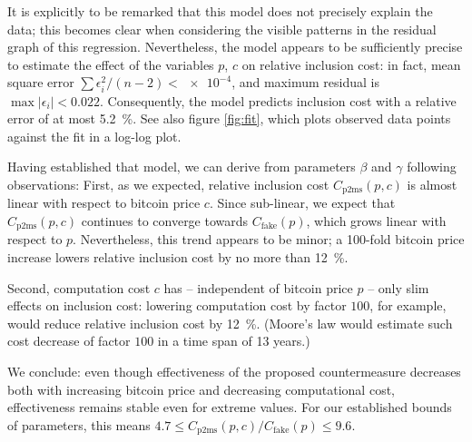 \documentclass[a4paper,11pt,titlepage]{scrbook}
\begin{document}
It is explicitly to be remarked that this model does not precisely explain the data; this becomes clear when considering the visible patterns in the residual graph of this regression.
Nevertheless, the model appears to be sufficiently precise to estimate the effect of the variables $p$, $c$ on relative inclusion cost: in fact, mean square error $\sum \epsilon_i^2/(n-2) < \num{e-4}$, and maximum residual is $\max |\epsilon_i| < 0.022$. Consequently, the model predicts inclusion cost with a relative error of at most \SI{5.2}{\percent}.
See also figure \ref{fig:fit}, which plots observed data points against the fit in a log-log plot.

Having established that model, we can derive from parameters $\beta$ and $\gamma$ following observations:
First, as we expected, relative inclusion cost $C_\mathrm{p2ms}(p,c)$ is almost linear with respect to bitcoin price $c$.
Since sub-linear, we expect that $C_\mathrm{p2ms}(p,c)$ continues to converge towards $C_\mathrm{fake}(p)$, which grows linear with respect to $p$.
Nevertheless, this trend appears to be minor; a 100-fold bitcoin price increase lowers relative inclusion cost by no more than \SI{12}{\percent}.

Second, computation cost $c$ has – independent of bitcoin price $p$ – only slim effects on inclusion cost: lowering computation cost by factor $100$, for example, would reduce relative inclusion cost by \SI{12}{\percent}. (Moore's law would estimate such cost decrease of factor $100$ in a time span of 13 years.)

We conclude: even though effectiveness of the proposed countermeasure decreases both with increasing bitcoin price and decreasing computational cost, effectiveness remains stable even for extreme values.
For our established bounds of parameters, this means $\num{4.7} \leq C_\mathrm{p2ms}(p,c) / C_\mathrm{fake}(p) \leq \num{9.6}$.
\end{document}
